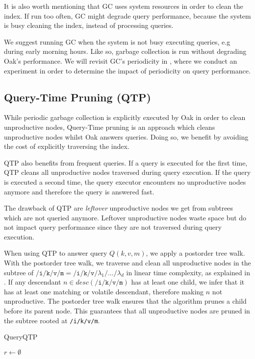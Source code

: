 \documentclass[abstracton,12pt]{scrartcl}
\theoremstyle{definition}
\begin{document}
It is also worth mentioning that GC uses system resources in order to clean the
index. If run too often, GC might degrade query performance, because the system
is busy cleaning the index, instead of processing queries.

We suggest running GC when the system is not busy executing queries, e.g during
early morning hours. Like so, garbage collection is run without degrading Oak's
performance. We will revisit GC's periodicity in , where we
conduct an experiment in order to determine the impact of periodicity on
query performance. 


\subsection{Query-Time Pruning (QTP)}

While periodic garbage collection is explicitly executed by Oak in order to
clean unproductive nodes, Query-Time pruning is an approach which cleans
unproductive nodes whilst Oak answers queries. Doing so, we benefit by
avoiding the cost of explicitly traversing the index.  

QTP also benefits from frequent queries. If a query is executed for the first
time, QTP cleans all unproductive nodes traversed during query execution.
If the query is executed a second time, the query executor encounters no
unproductive nodes anymore and therefore the query is answered fast.

The drawback of QTP are \textit{leftover}
unproductive nodes we get from subtrees which are not queried anymore. Leftover
unproductive nodes waste space but do not impact query performance since they are
not traversed during query execution.

When using QTP to answer query $Q(k,v,m)$, we apply a postorder tree walk.
With the postorder tree walk, we traverse and clean all unproductive nodes in
the subtree of $\texttt{/i/k/v/m} =
\texttt{/i/k/v/} \lambda_1 \texttt{/} \dots \texttt{/} \lambda_d$ in linear time
complexity, as explained in . If any descendant $n \in
desc(\texttt{/i/k/v/m})$ has at least one child, we
infer that it has at least one matching or volatile descendant, therefore making
$n$ not unproductive. The postorder tree walk ensures that the algorithm prunes
a child before its parent node. This guarantees that all unproductive nodes are
pruned in the subtree rooted at \texttt{/i/k/v/m}.

\begin{algorithm}
  \caption{QueryQTP}
  \DontPrintSemicolon
  $r \longleftarrow \emptyset$\;
  \;
  \label{algo:query_qtp_wapi}
\end{algorithm}
\end{document}
